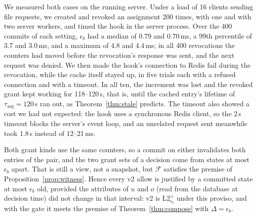 We measured both cases on the running server. Under a load of 16 clients sending file requests, we created and
revoked an assignment 200 times, with one and with two server workers, and timed the hook in the server process.
Over the 400 commits of each setting, $\epsilon_b$ had a median of 0.79 and 0.70\,ms, a 99th percentile of 3.7 and
3.0\,ms, and a maximum of 4.8 and 4.4\,ms; in all 400 revocations the counters had moved before the revocation's
response was sent, and the next request was denied. We then made the hook's connection to Redis fail during the
revocation, while the cache itself stayed up, in five trials each with a refused connection and with a timeout.
In all ten, the increment was lost and the revoked grant kept working for 118--120\,s, that is, until the
cached entry's lifetime of $\tau_{\mathrm{asg}}=120$\,s ran out, as Theorem~\ref{thm:stale} predicts. The timeout
also showed a cost we had not expected: the hook uses a synchronous Redis client, so the 2\,s timeout blocks the
server's event loop, and an unrelated request sent meanwhile took 1.8\,s instead of 12--21\,ms.

Both grant kinds use the same counters, so a commit on either invalidates both entries of the pair, and the two
grant sets of a decision come from states at most $\epsilon_b$ apart. That is still a view, not a snapshot, but
$\mathcal{F}$ satisfies the premise of Proposition~\ref{prop:witness}. Hence every v2 allow is justified by a
committed state at most $\epsilon_b$ old, provided the attributes of $u$ and $o$ (read from the database at decision
time) did not change in that interval: v2 is L2$^+_{\epsilon_b}$ under this proviso, and with the gate it meets the
premise of Theorem~\ref{thm:compose} with $\Delta=\epsilon_b$.

\smallskip\noindent{}

